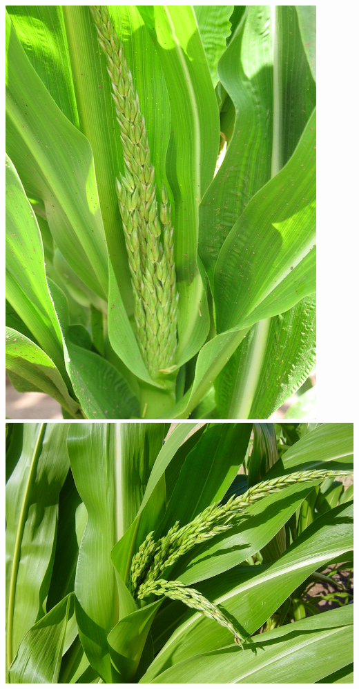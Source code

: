 \documentclass[12pt,]{article}
\begin{document}
\includegraphics{./images/growth/3_tassel_development.jpg}
\includegraphics{./images/growth/4_tassel_development.jpg}
\end{document}
